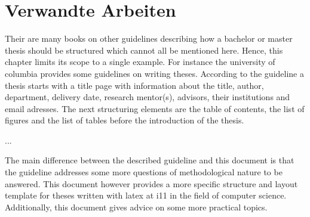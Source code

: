 
\chapter{Verwandte Arbeiten}
\label{sect:relatedWork}



Their are many books on other guidelines describing how a bachelor or master thesis should be structured which cannot all be mentioned here.
Hence, this chapter limits its scope to a single example.
For instance the university of columbia provides some guidelines on writing theses.
According to the guideline a thesis starts with a title page with information about the title, author, department, delivery date, research mentor(s), advisors, their institutions and email adresses.
The next structuring elements are the table of contents, the list of figures and the list of tables before the introduction of the thesis.

...

The main difference between the described guideline and this document is that the guideline addresses some more questions of methodological nature to be answered.
This document however provides a more specific structure and layout template for theses written with latex at i11 in the field of computer science.
Additionally, this document gives advice on some more practical topics.
